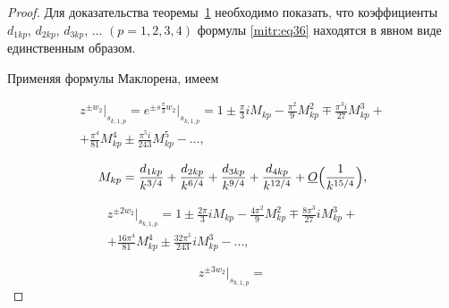 \begin{proof} Для доказательства теоремы~\hyperlink{mitr:th1}{1}  необходимо показать, что коэффициенты $d_{1kp}$, $d_{2kp}$, $d_{3kp}$, $\dots$  $(p=1,2,3,4)$ формулы \eqref{mitr:eq36} находятся в явном виде единственным образом.



Применяя формулы Маклорена, имеем


\begin{multline*}

z^{\pm w_2}

\big|_{s_{k,1,p}}

=e^{\pm s\frac\pi3 w_2}

\big|_{s_{k,1,p}}=1\pm \frac\pi3 iM_{kp}-\frac{\pi^2}9 M^2_{kp}\mp\frac{\pi^3 i}{27} M^3_{kp}+\\

+\frac{\pi^4}{81} M^4_{kp} \pm\frac{\pi^5 i}{243} M^5_{kp}-\dots,

\end{multline*}

\begin{equation}

\label{mitr:eq37}

M_{kp}=\frac{d_{1kp}}{k^{3/4}} +\frac{d_{2kp}}{k^{6/4}}+\frac{d_{3kp}}{k^{9/4}}+\frac{d_{4kp}}{k^{12/4}}+\underline O\Bigl(\frac1{k^{{15}/4}}\Bigr),

\end{equation}

\begin{multline}

\label{mitr:eq39}

z^{\pm 2w_2}

\big|_{s_{k,1,p}}=

1\pm \frac{2\pi}3 iM_{kp}-\frac{4\pi^2}9 M^2_{kp}\mp

\frac{8\pi^3}{27}i M^3_{kp}+\\

+\frac{16\pi^4}{81} M^4_{kp}\pm

\frac{32\pi^5}{243} iM^3_{kp}-\dots,

\end{multline}

\begin{equation}

\label{mitr:eq39}

z^{\pm 3w_2}

\big|_{s_{k,1,p}}=


\end{equation}
\end{proof}
